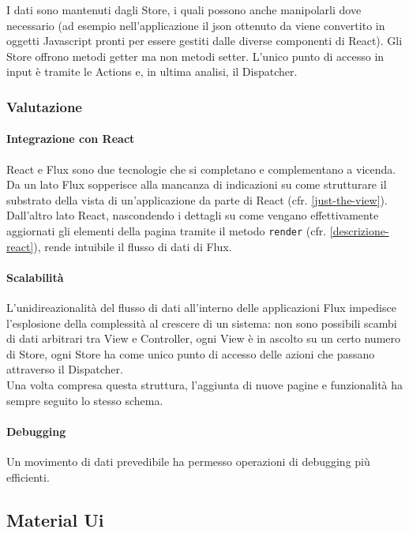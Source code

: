 I dati sono mantenuti dagli Store, i quali possono anche manipolarli dove necessario (ad
esempio nell'applicazione il json ottenuto da \fiscoloWeb{} viene convertito in oggetti
Javascript pronti per essere gestiti dalle diverse componenti di React). Gli Store offrono
metodi getter ma non metodi setter. L'unico punto di accesso in input è tramite le Actions
e, in ultima analisi, il Dispatcher.

\subsubsection{Valutazione}

\paragraph{Integrazione con React}
React e Flux sono due tecnologie che si completano e complementano a vicenda. Da un lato
Flux sopperisce alla mancanza di indicazioni su come strutturare il substrato della vista
di un'applicazione da parte di React (cfr. \ref{just-the-view}). Dall'altro lato React,
nascondendo i dettagli su come vengano effettivamente aggiornati gli elementi della pagina
tramite il metodo \texttt{render} (cfr. \ref{descrizione-react}), rende intuibile il flusso
di dati di Flux.

\paragraph{Scalabilità}
L'unidireazionalità del flusso di dati all'interno delle applicazioni Flux impedisce
l'esplosione della complessità al crescere di un sistema: non sono possibili scambi di
dati arbitrari tra View e Controller, ogni View è in ascolto su un certo numero di Store,
ogni Store ha come unico punto di accesso delle azioni che passano attraverso il Dispatcher. \\

Una volta compresa questa struttura, l'aggiunta di nuove pagine e funzionalità
ha sempre seguito lo stesso schema.

\paragraph{Debugging}
Un movimento di dati prevedibile ha permesso operazioni di debugging più efficienti.

\subsection{Material Ui}\label{material-ui}

